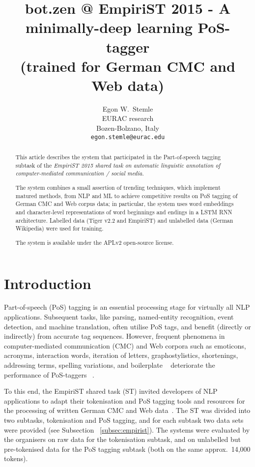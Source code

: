 \documentclass[11pt]{article}
\title{bot.zen @ EmpiriST 2015 - A minimally-deep learning PoS-tagger \\
       (trained for German CMC and Web data)}
\author{Egon W.~Stemle \\
  EURAC research \\
  Bozen-Bolzano, Italy \\
  {\tt egon.stemle@eurac.edu}}
\date{}
\begin{document}
\maketitle

\begin{abstract} %
    This article describes the system that participated in the Part-of-speech
    tagging subtask of the \emph{EmpiriST 2015 shared task on automatic
    linguistic annotation of computer-mediated communication / social
    media}.

    The system combines a small assertion of trending techniques, which
    implement matured methods, from NLP and ML to achieve competitive results
    on PoS tagging of German CMC and Web corpus data; in particular, the system
    uses word embeddings and character-level representations of word beginnings
    and endings in a LSTM RNN architecture.  
    Labelled data (Tiger v2.2 and EmpiriST) and unlabelled data (German
    Wikipedia) were used for training.

    The system is available under the APLv2 open-source license.
\end{abstract}


\section{Introduction} %
\label{sec:intro}

Part-of-speech (PoS) tagging is an essential processing stage for virtually all
NLP applications.
Subsequent tasks, like parsing, named-entity recognition, event
detection, and machine translation, often utilise PoS tags, and benefit
(directly or indirectly) from accurate tag sequences.
However, frequent phenomena in computer-mediated communication (CMC) and Web
corpora such as emoticons, acronyms, interaction words, iteration of letters,
graphostylistics, shortenings, addressing terms, spelling variations, and
boilerplate%
~\cite{androutsopoulos2007,BernardiniBaroniEvert2008,beisswenger2013}
deteriorate the performance of PoS-taggers%
~\cite{giesbrecht2009,baldwin-EtAl:2013:IJCNLP}.

To this end, the EmpiriST shared task (ST) invited developers of NLP
applications to adapt their tokenisation and PoS tagging tools and resources
for the processing of written German CMC and Web data~\cite{empirist2016}. 
The ST was divided into two subtasks, tokenisation and PoS tagging, and
for each subtask two data sets were provided (see Subsection%
~\ref{subsec:empirist}).
The systems were evaluated by the organisers on raw data for the tokenisation
subtask, and on unlabelled but pre-tokenised data for the PoS tagging subtask
(both on the same approx.~14,000 tokens).
\end{document}
